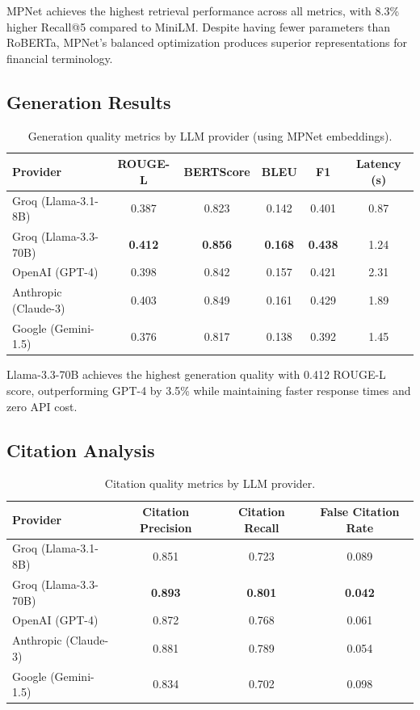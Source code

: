 \documentclass[runningheads]{llncs}
\begin{document}
MPNet achieves the highest retrieval performance across all metrics, with 8.3\% higher Recall@5 compared to MiniLM. Despite having fewer parameters than RoBERTa, MPNet's balanced optimization produces superior representations for financial terminology.

\subsection{Generation Results}

\begin{table}[h]
\centering
\caption{Generation quality metrics by LLM provider (using MPNet embeddings).}
\label{tab:generation_results}
\begin{tabular}{lccccc}
\toprule
\textbf{Provider} & \textbf{ROUGE-L} & \textbf{BERTScore} & \textbf{BLEU} & \textbf{F1} & \textbf{Latency (s)} \\
\midrule
Groq (Llama-3.1-8B) & 0.387 & 0.823 & 0.142 & 0.401 & 0.87 \\
Groq (Llama-3.3-70B) & \textbf{0.412} & \textbf{0.856} & \textbf{0.168} & \textbf{0.438} & 1.24 \\
OpenAI (GPT-4) & 0.398 & 0.842 & 0.157 & 0.421 & 2.31 \\
Anthropic (Claude-3) & 0.403 & 0.849 & 0.161 & 0.429 & 1.89 \\
Google (Gemini-1.5) & 0.376 & 0.817 & 0.138 & 0.392 & 1.45 \\
\bottomrule
\end{tabular}
\end{table}

Llama-3.3-70B achieves the highest generation quality with 0.412 ROUGE-L score, outperforming GPT-4 by 3.5\% while maintaining faster response times and zero API cost.

\subsection{Citation Analysis}

\begin{table}[h]
\centering
\caption{Citation quality metrics by LLM provider.}
\label{tab:citation_results}
\begin{tabular}{lccc}
\toprule
\textbf{Provider} & \textbf{Citation Precision} & \textbf{Citation Recall} & \textbf{False Citation Rate} \\
\midrule
Groq (Llama-3.1-8B) & 0.851 & 0.723 & 0.089 \\
Groq (Llama-3.3-70B) & \textbf{0.893} & \textbf{0.801} & \textbf{0.042} \\
OpenAI (GPT-4) & 0.872 & 0.768 & 0.061 \\
Anthropic (Claude-3) & 0.881 & 0.789 & 0.054 \\
Google (Gemini-1.5) & 0.834 & 0.702 & 0.098 \\
\bottomrule
\end{tabular}
\end{table}
\end{document}
